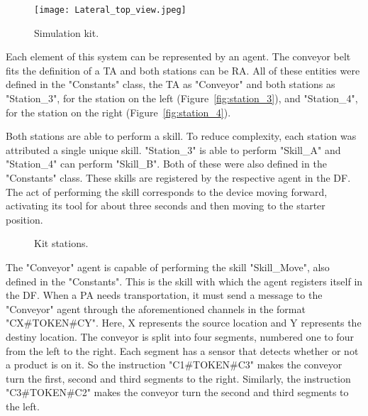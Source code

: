 \begin{figure}[h!]
	\centering
	\texttt{[image: Lateral\_top\_view.jpeg]}
	\caption{Simulation kit.}
	\label{fig:physical_system}
\end{figure}

Each element of this system can be represented by an agent. The conveyor belt fits the definition of a \acrlong{TA} and both stations can be \acrlong{RA}. All of these entities were defined in the "Constants" class, the \acrshort{TA} as "Conveyor" and both stations as "Station\_3", for the station on the left (Figure~\ref{fig:station_3}), and "Station\_4", for the station on the right (Figure~\ref{fig:station_4}). 

Both stations are able to perform a skill. To reduce complexity, each station was attributed a single unique skill. "Station\_3" is able to perform "Skill\_A" and "Station\_4" can perform "Skill\_B". Both of these were also defined in the "Constants" class. These skills are registered by the respective agent in the \acrshort{DF}. The act of performing the skill corresponds to the device moving forward, activating its tool for about three seconds and then moving to the starter position.\\

\begin{figure}[h!]
	\centering
	\hspace{0.80cm}
	\caption{Kit stations.}
	\label{fig:stations}
\end{figure}

The "Conveyor" agent is capable of performing the skill "Skill\_Move", also defined in the "Constants". This is the skill with which the agent registers itself in the \acrshort{DF}. When a \acrlong{PA} needs transportation, it must send a message to the "Conveyor" agent through the aforementioned channels in the format "CX\#TOKEN\#CY". Here, X represents the source location and Y represents the destiny location. The conveyor is split into four segments, numbered one to four from the left to the right. Each segment has a sensor that detects whether or not a product is on it. So the instruction "C1\#TOKEN\#C3" makes the conveyor turn the first, second and third segments to the right. Similarly, the instruction "C3\#TOKEN\#C2" makes the conveyor turn the second and third segments to the left.\\

